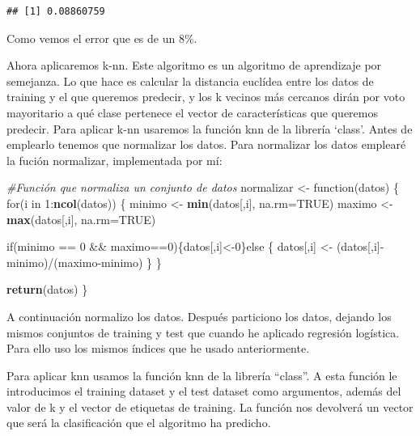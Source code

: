\documentclass[]{article}
\newenvironment{Shaded}{\begin{snugshade}}{\end{snugshade}}
\newcommand{\KeywordTok}[1]{\textcolor[rgb]{0.13,0.29,0.53}{\textbf{{#1}}}}
\newcommand{\DataTypeTok}[1]{\textcolor[rgb]{0.13,0.29,0.53}{{#1}}}
\newcommand{\DecValTok}[1]{\textcolor[rgb]{0.00,0.00,0.81}{{#1}}}
\newcommand{\StringTok}[1]{\textcolor[rgb]{0.31,0.60,0.02}{{#1}}}
\newcommand{\CommentTok}[1]{\textcolor[rgb]{0.56,0.35,0.01}{\textit{{#1}}}}
\newcommand{\OtherTok}[1]{\textcolor[rgb]{0.56,0.35,0.01}{{#1}}}
\newcommand{\NormalTok}[1]{{#1}}
\begin{document}
\begin{verbatim}
## [1] 0.08860759
\end{verbatim}

Como vemos el error que es de un 8\%.

Ahora aplicaremos k-nn. Este algoritmo es un algoritmo de aprendizaje
por semejanza. Lo que hace es calcular la distancia euclídea entre los
datos de training y el que queremos predecir, y los k vecinos más
cercanos dirán por voto mayoritario a qué clase pertenece el vector de
características que queremos predecir. Para aplicar k-nn usaremos la
función knn de la librería `class'. Antes de emplearlo tenemos que
normalizar los datos. Para normalizar los datos emplearé la fución
normalizar, implementada por mí:

\begin{Shaded}
\begin{Highlighting}[]
\CommentTok{#Función que normaliza un conjunto de datos}
\NormalTok{normalizar <-}\StringTok{ }\NormalTok{function(datos)}
\NormalTok{\{}
  \NormalTok{for(i in }\DecValTok{1}\NormalTok{:}\KeywordTok{ncol}\NormalTok{(datos))}
  \NormalTok{\{}
    \NormalTok{minimo <-}\StringTok{ }\KeywordTok{min}\NormalTok{(datos[,i], }\DataTypeTok{na.rm=}\OtherTok{TRUE}\NormalTok{)}
    \NormalTok{maximo <-}\StringTok{ }\KeywordTok{max}\NormalTok{(datos[,i], }\DataTypeTok{na.rm=}\OtherTok{TRUE}\NormalTok{)}
    
    \NormalTok{if(minimo ==}\StringTok{ }\DecValTok{0} \NormalTok{&&}\StringTok{ }\NormalTok{maximo==}\DecValTok{0}\NormalTok{)\{datos[,i]<-}\DecValTok{0}\NormalTok{\}else}
    \NormalTok{\{}
      \NormalTok{datos[,i] <-}\StringTok{ }\NormalTok{(datos[,i]-minimo)/(maximo-minimo)}
    \NormalTok{\}}
  \NormalTok{\}}
  
  \KeywordTok{return}\NormalTok{(datos)}
\NormalTok{\}}
\end{Highlighting}
\end{Shaded}

A continuación normalizo los datos. Después particiono los datos,
dejando los mismos conjuntos de training y test que cuando he aplicado
regresión logística. Para ello uso los mismos índices que he usado
anteriormente.

Para aplicar knn usamos la función knn de la librería ``class''. A esta
función le introducimos el training dataset y el test dataset como
argumentos, además del valor de k y el vector de etiquetas de training.
La función nos devolverá un vector que será la clasificación que el
algoritmo ha predicho.
\end{document}
